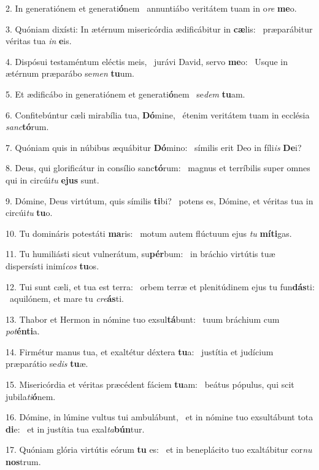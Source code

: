 2. In generatiónem et generati\textbf{ó}nem \ast\  annuntiábo veritátem tuam in o\textit{re} \textbf{me}o.\

3. Quóniam dixísti: In ætérnum misericórdia ædificábitur in \textbf{cæ}lis: \ast\  præparábitur véritas tua \textit{in} \textbf{e}is.\

4. Dispósui testaméntum eléctis meis, \dag\  jurávi David, servo \textbf{me}o: \ast\  Usque in ætérnum præparábo se\textit{men} \textbf{tu}um.\

5. Et ædificábo in generatiónem et generati\textbf{ó}nem \ast\  se\textit{dem} \textbf{tu}am.\

6. Confitebúntur cæli mirabília tua, \textbf{Dó}mine, \ast\  étenim veritátem tuam in ecclésia \textit{sanc}\textbf{tó}rum.\

7. Quóniam quis in núbibus æquábitur \textbf{Dó}mino: \ast\  símilis erit Deo in fíli\textit{is} \textbf{De}i?\

8. Deus, qui glorificátur in consílio sanc\textbf{tó}rum: \ast\  magnus et terríbilis super omnes qui in circúi\textit{tu} \textbf{e}\textbf{jus} sunt.\

9. Dómine, Deus virtútum, quis símilis \textbf{ti}bi? \ast\  potens es, Dómine, et véritas tua in circúi\textit{tu} \textbf{tu}o.\

10. Tu domináris potestáti \textbf{ma}ris: \ast\  motum autem flúctuum ejus \textit{tu} \textbf{mí}\textbf{ti}gas.\

11. Tu humiliásti sicut vulnerátum, su\textbf{pér}bum: \ast\  in bráchio virtútis tuæ dispersísti inimí\textit{cos} \textbf{tu}os.\

12. Tui sunt cæli, et tua est terra: \dag\  orbem terræ et plenitúdinem ejus tu fun\textbf{dás}ti: \ast\  aquilónem, et mare tu \textit{cre}\textbf{ás}ti.\

13. Thabor et Hermon in nómine tuo exsul\textbf{tá}bunt: \ast\  tuum bráchium cum \textit{pot}\textbf{én}\textbf{ti}a.\

14. Firmétur manus tua, et exaltétur déxtera \textbf{tu}a: \ast\  justítia et judícium præparátio se\textit{dis} \textbf{tu}æ.\

15. Misericórdia et véritas præcédent fáciem \textbf{tu}am: \ast\  beátus pópulus, qui scit jubila\textit{ti}\textbf{ó}nem.\

16. Dómine, in lúmine vultus tui ambulábunt, \dag\  et in nómine tuo exsultábunt tota \textbf{di}e: \ast\  et in justítia tua exal\textit{ta}\textbf{bún}tur.\

17. Quóniam glória virtútis eórum \textbf{tu} es: \ast\  et in beneplácito tuo exaltábitur cor\textit{nu} \textbf{nos}trum.\

